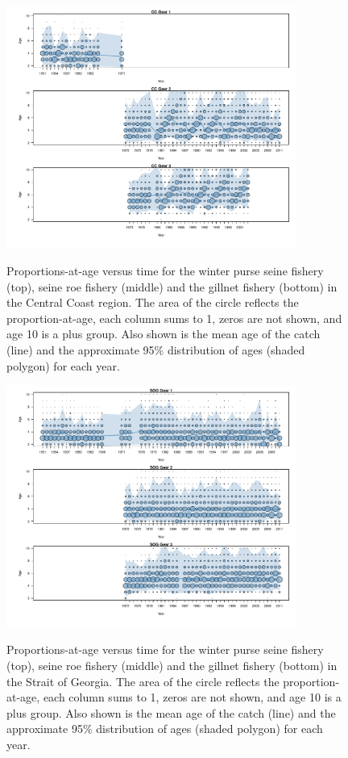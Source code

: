 \begin{figure}
	\centering
	\includegraphics[width=0.85\textwidth]{../Figs/iscam_fig_AgeCompsCC.pdf}\\
	\caption{Proportions-at-age versus time for the winter purse seine fishery (top), seine roe fishery (middle) and the gillnet fishery (bottom) in the Central Coast region.  The area of the circle reflects the proportion-at-age, each column sums to 1, zeros are not shown, and age 10 is a plus group. Also shown is the mean age of the catch (line) and the approximate 95\% distribution of ages (shaded polygon) for each year.}\label{FigAgeCompsCC}
\end{figure}

\begin{figure}
	\centering
	\includegraphics[width=0.85\textwidth]{../Figs/iscam_fig_AgeCompsSOG.pdf}\\
	\caption{Proportions-at-age versus time for the winter purse seine fishery (top), seine roe fishery (middle) and the gillnet fishery (bottom) in the Strait of Georgia.  The area of the circle reflects the proportion-at-age, each column sums to 1, zeros are not shown, and age 10 is a plus group. Also shown is the mean age of the catch (line) and the approximate 95\% distribution of ages (shaded polygon) for each year.}\label{FigAgeCompsSOG}
\end{figure}

